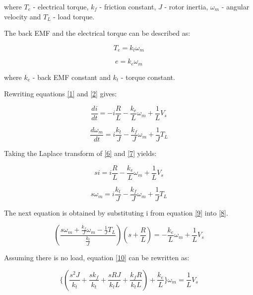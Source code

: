 where $T_{e}$ - electrical torque, $k_{f}$ - friction constant, $J$ - rotor inertia, $\omega_{m}$ - angular velocity and $T_{L}$ - load torque.

The back EMF and the electrical torque can be described as:

\begin{equation}
\label{4}
	T_{e}=k_{t}\omega_{m}
\end{equation}

\begin{equation}
\label{5}
	e=k_{e}\omega_{m}
\end{equation}

where $k_{e}$ - back EMF constant and $k_{t}$ - torque constant.

Rewriting equations \ref{1} and \ref{2} gives:

\begin{equation}
\label{6}
	\frac{di}{dt}=-i\frac{R}{L}-\frac{k_{e}}{L}\omega_{m}+\frac{1}{L}V_{s}
\end{equation}

\begin{equation}
\label{7}
	\frac{d\omega_{m}}{dt}=i\frac{k_{t}}{J}-\frac{k_{f}}{J}\omega_{m}+\frac{1}{J}T_{L}
\end{equation}

Taking the Laplace transform of \ref{6} and \ref{7} yields:

\begin{equation}
\label{8}
	si=i\frac{R}{L}-\frac{k_{e}}{L}\omega_{m}+\frac{1}{L}V_{s}
\end{equation}

\begin{equation}
\label{9}
	s\omega_{m}=i\frac{k_{t}}{J}-\frac{k_{f}}{J}\omega_{m}+\frac{1}{J}T_{L}
\end{equation}

The next equation is obtained by substituting i from equation \ref{9} into \ref{8}.

\begin{equation}
\label{10}
	(\frac{s\omega_{m}+\frac{k_{f}}{J}\omega_{m}-\frac{1}{J}T_{L}}{\frac{k_{t}}{J}})(s+\frac{R}{L})=-\frac{k_{e}}{L}\omega_{m}+\frac{1}{L}V_{s}
\end{equation}  

Assuming there is no load, equation \ref{10} can be rewritten as:

\begin{equation}
\label{11}
	\lbrace{(\frac{s^{2}J}{k_{t}}+\frac{sk_{f}}{k_{t}}+\frac{sRJ}{k_{t}L}+\frac{k_{f}R}{k_{t}L})+\frac{k_{e}}{L}}\rbrace\omega_{m}=\frac{1}{L}V_{s}
\end{equation}

